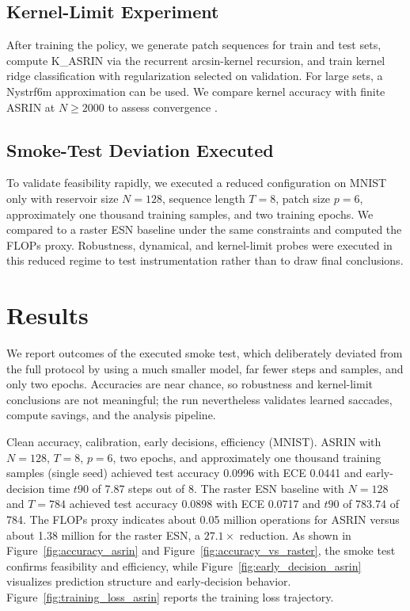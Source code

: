 \documentclass{article}
\begin{document}
\subsection{Kernel-Limit Experiment}
After training the policy, we generate patch sequences for train and test sets, compute K\_ASRIN via the recurrent arcsin-kernel recursion, and train kernel ridge classification with regularization selected on validation. For large sets, a Nystr f6m approximation can be used. We compare kernel accuracy with finite ASRIN at $N\ge 2000$ to assess convergence \cite{dong-2020-reservoir}.

\subsection{Smoke-Test Deviation Executed}
To validate feasibility rapidly, we executed a reduced configuration on MNIST only with reservoir size $N=128$, sequence length $T=8$, patch size $p=6$, approximately one thousand training samples, and two training epochs. We compared to a raster ESN baseline under the same constraints and computed the FLOPs proxy. Robustness, dynamical, and kernel-limit probes were executed in this reduced regime to test instrumentation rather than to draw final conclusions.

\section{Results}
We report outcomes of the executed smoke test, which deliberately deviated from the full protocol by using a much smaller model, far fewer steps and samples, and only two epochs. Accuracies are near chance, so robustness and kernel-limit conclusions are not meaningful; the run nevertheless validates learned saccades, compute savings, and the analysis pipeline.

Clean accuracy, calibration, early decisions, efficiency (MNIST). ASRIN with $N=128$, $T=8$, $p=6$, two epochs, and approximately one thousand training samples (single seed) achieved test accuracy 0.0996 with ECE 0.0441 and early-decision time $t90$ of 7.87 steps out of 8. The raster ESN baseline with $N=128$ and $T=784$ achieved test accuracy 0.0898 with ECE 0.0717 and $t90$ of 783.74 of 784. The FLOPs proxy indicates about 0.05 million operations for ASRIN versus about 1.38 million for the raster ESN, a $27.1\times$ reduction. As shown in Figure~\ref{fig:accuracy_asrin} and Figure~\ref{fig:accuracy_vs_raster}, the smoke test confirms feasibility and efficiency, while Figure~\ref{fig:early_decision_asrin} visualizes prediction structure and early-decision behavior. Figure~\ref{fig:training_loss_asrin} reports the training loss trajectory.
\end{document}
